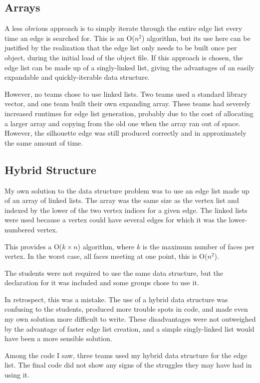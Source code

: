 \documentclass[10pt,twocolumn]{article}
\begin{document}
\subsection{Arrays}
A less obvious approach is to simply iterate through the entire edge list every time an edge is searched for.  This is an O($n^2$) algorithm, but its use here can be justified by the realization that the edge list only needs to be built once per object, during the initial load of the object file.  If this approach is chosen, the edge list can be made up of a singly-linked list, giving the advantages of an easily expandable and quickly-iterable data structure.  

However, no teams chose to use linked lists.  Two teams used a standard library vector, and one team built their own expanding array.  These teams had severely increased runtimes for edge list generation, probably due to the cost of allocating a larger array and copying from the old one when the array ran out of space.  However, the silhouette edge was still produced correctly and in approximately the same amount of time.  

\subsection{Hybrid Structure}
My own solution to the data structure problem was to use an edge list made up of an array of linked lists.  The array was the same size as the vertex list and indexed by the lower of the two vertex indices for a given edge.  The linked lists were used because a vertex could have several edges for which it was the lower-numbered vertex.  

This provides a O($k \times n$) algorithm, where $k$ is the maximum number of faces per vertex.  In the worst case, all faces meeting at one point, this is O($n^2$).  

The students were not required to use the same data structure, but the declaration for it was included and some groups chose to use it.  

In retrospect, this was a mistake.  The use of a hybrid data structure was confusing to the students, produced more trouble spots in code, and made even my own solution more difficult to write.  These disadvantages were not outweighed by the advantage of faster edge list creation, and a simple singly-linked list would have been a more sensible solution.  

Among the code I saw, three teams used my hybrid data structure for the edge list.  The final code did not show any signs of the struggles they may have had in using it.  
\end{document}
